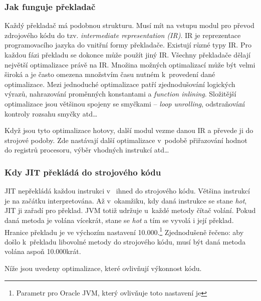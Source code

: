 \subsubsection{Jak funguje překladač}
Každý překladač má podobnou strukturu.
Musí mít na vstupu modul pro převod zdrojového kódu do tzv. \emph{intermediate representation (IR)}.
IR je reprezentace programovacího jazyka do vnitřní formy překladače.
Existují různé typy IR. Pro každou fázi překladu se dokonce může použít jiný IR.
Všechny překladače dělají největší optimalizace právě na IR.
Množina možných optimalizací může být velmi široká a je často omezena množstvím času nutném k~provedení dané optimalizace.
Mezi jednoduché optimalizace patří zjednodušování logických výrazů, nahrazování proměnných konstantami a \emph{function inlining}.
Složitější optimalizace jsou většinou spojeny se smyčkami -- \emph{loop unrolling}, odstraňování kontroly rozsahu smyčky atd\ldots{}

Když jsou tyto optimalizace hotovy, další modul vezme danou IR a převede ji do strojové podoby. Zde nastávají další optimalizace v~podobě přiřazování hodnot do registrů procesoru, výběr vhodných instrukcí atd\ldots{}

\subsubsection{Kdy JIT překládá do strojového kódu\label{subsub:whenJIT}}
JIT nepřekládá každou instrukci v~\bytecode{} ihned do strojového kódu. Většina instrukcí je na začátku interpretována. Až v~okamžiku, kdy daná instrukce se stane \emph{hot}, JIT ji zařadí pro překlad. JVM totiž udržuje u~každé metody čítač volání. Pokud daná metoda je volána vícekrát, stane se \emph{hot} a tím se vyvolá i její překlad. Hranice překladu je ve výchozím nastavení 10.000.\footnote{Parametr pro Oracle JVM, který ovlivňuje toto nastavení je } Zjednodušeně řečeno: aby došlo k~překladu libovolné metody do strojového kódu, musí být daná metoda volána aspoň 10.000krát.

Níže jsou uvedeny optimalizace, které ovlivňují výkonnost kódu.

